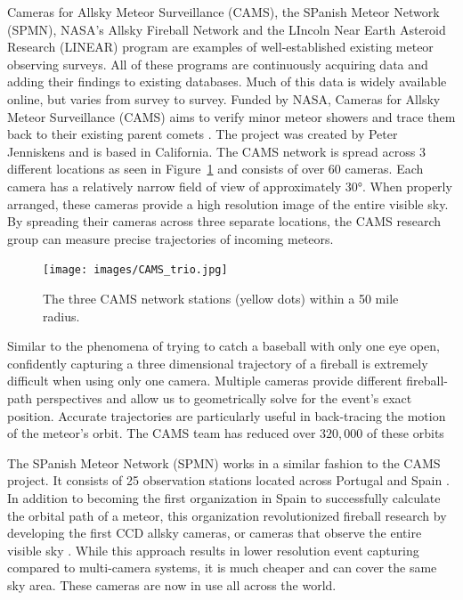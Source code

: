 Cameras for Allsky Meteor Surveillance (CAMS), the SPanish Meteor Network (SPMN), NASA's Allsky Fireball Network and the LIncoln Near Earth Asteroid Research (LINEAR) program are examples of well-established existing meteor observing surveys.
All of these programs are continuously acquiring data and adding their findings to existing databases.  
Much of this data is widely available online, but varies from survey to survey.
Funded by NASA, Cameras for Allsky Meteor Surveillance (CAMS) aims to verify minor meteor showers and trace them back to their existing parent comets \cite{jenniskens_cams:_2011}.  
The project was created by Peter Jenniskens and is based in California.  
The CAMS network is spread across 3 different locations as seen in Figure~\ref{trio} and consists of over 60 cameras.
Each camera has a relatively narrow field of view of approximately \ang{30}.
When properly arranged, these cameras provide a high resolution image of the entire visible sky.
By spreading their cameras across three separate locations, the CAMS research group can measure precise trajectories of incoming meteors. 

\begin{figure}[ht!]
  \centering
  \texttt{[image: images/CAMS\_trio.jpg]}
  \caption{The three CAMS network stations (yellow dots) within a 50 mile radius.}
  \label{trio}
\end{figure}



Similar to the phenomena of trying to catch a baseball with only one eye open, confidently capturing a three dimensional trajectory of a fireball is extremely difficult when using only one camera.
Multiple cameras provide different fireball-path perspectives and allow us to geometrically solve for the event's exact position.
Accurate trajectories are particularly useful in back-tracing the motion of the meteor's orbit.  
The CAMS team has reduced over $320,000$ of these orbits \cite{peter_jenniskens_cameras_2018}


The SPanish Meteor Network (SPMN) works in a similar fashion to the CAMS project.  
It consists of 25 observation stations located across Portugal and Spain \cite{trigo-rodriguez_2006_2007}.
In addition to becoming the first organization in Spain to successfully calculate the orbital path of a meteor, this organization revolutionized fireball research by developing the first CCD allsky cameras, or cameras that observe the entire visible sky \cite{jordi_l._pique_presentation_nodate}.
While this approach results in lower resolution event capturing compared to multi-camera systems, it is much cheaper and can cover the same sky area.
These cameras are now in use all across the world.


